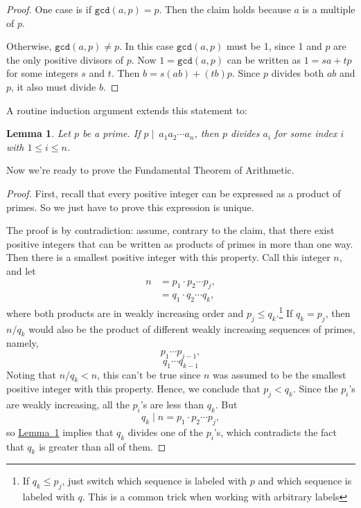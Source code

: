 \documentclass[11pt,oneside]{book}
\newtheorem{lem}[thm]{Lemma}
\theoremstyle{definition}
\begin{document}
\begin{proof}
    One case is if $\texttt{gcd}(a, p) = p$.
    Then the claim holds because $a$ is a multiple of $p$.

    Otherwise, $\texttt{gcd}(a, p) \neq p$.
    In this case $\texttt{gcd}(a, p)$ must be 1, since 1 and $p$ are the only positive divisors of $p$.
    Now $1 = \texttt{gcd}(a, p)$ can be written as $1 = sa + tp$ for some integers $s$ and $t$.
    Then $b = s(ab) + (tb)p$.
    Since $p$ divides both $ab$ and $p$, it also must divide $b$.
\end{proof}

A routine induction argument extends this statement to:

\begin{lem} \label{lem:PrimeDividesGeneralized}
    Let $p$ be a prime.
    If $p \mid\ a_{1}a_{2} \cdots a_{n}$, then $p$ divides $a_{i}$ for some index $i$ with $1 \leq i \leq n$.
\end{lem}

Now we're ready to prove the Fundamental Theorem of Arithmetic.

\begin{proof}
    First, recall that every positive integer can be expressed as a product of primes. So we just have to prove this expression is unique.

    The proof is by contradiction: assume, contrary to the claim, that there exist positive integers that can be written as products of primes in more than one way.
    Then there is a smallest positive integer with this property.
    Call this integer $n$, and let
    \begin{align*}
        n
        &= p_{1} \cdot p_{2} \cdots p_{j}, \\
        &= q_{1} \cdot q_{2} \cdots q_{k},
    \end{align*}
    where both products are in weakly increasing order and $p_{j} \leq q_{k}$.\footnote{
        If $q_{k} \leq p_{j}$, just switch which sequence is labeled with $p$ and which sequence is labeled with $q$.
        This is a common trick when working with arbitrary labels
    }
    If $q_{k} = p_{j}$, then $n/q_{k}$ would also be the product of different weakly increasing sequences of primes, namely,
    \[ p_{1} \cdots p_{j - 1}, \]
    \[ q_{1} \cdots q_{k - 1} \]
    Noting that $n/q_{k} < n$, this can't be true since $n$ was assumed to be the smallest positive integer with this property.
    Hence, we conclude that $p_{j} < q_{k}$.
    Since the $p_{i}$'s are weakly increasing, all the $p_{i}$'s are less than $q_{k}$.
    But
    \[ q_{k} \mid n = p_{1} \cdot p_{2} \cdots p_{j}, \]
    so \hyperref[lem:PrimeDividesGeneralized]{Lemma~\ref*{lem:PrimeDividesGeneralized}} implies that $q_{k}$ divides one of the $p_{i}$'s, which contradicts the fact
    that $q_{k}$ is greater than all of them.
\end{proof}
\end{document}
